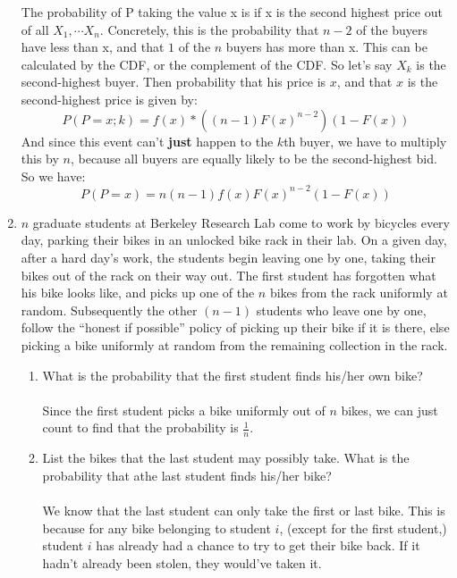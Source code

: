 \begin{enumerate}
    The probability of P taking the value x is if x is the second highest price out of all $X_1, \cdots X_n$. Concretely, this is the probability that $n-2$ of the buyers have less than x, and that $1$ of the $n$ buyers has more than x. This can be calculated by the CDF, or the complement of the CDF. So let's say $X_k$ is the second-highest buyer. Then probability that his price is $x$, and that $x$ is the second-highest price is given by:
    $$P(P = x; k) = f(x) * ((n-1)F(x)^{n-2})(1-F(x))$$
    And since this event can't \textbf{just} happen to the $k$th buyer, we have to multiply this by $n$, because all buyers are equally likely to be the second-highest bid. So we have:
    $$P(P = x) = n(n-1)f(x)F(x)^{n-2}(1-F(x))$$


  \item $n$ graduate students at Berkeley Research Lab come to work by bicycles every day, parking their bikes in an unlocked bike rack in their lab. On a given day, after a hard day's work, the students begin leaving one by one, taking their bikes out of the rack on their way out. The first student has forgotten what his bike looks like, and picks up one of the $n$ bikes from the rack uniformly at random. Subsequently the other $(n-1)$ students who leave one by one, follow the ``honest if possible'' policy of picking up their bike if it is there, else picking a bike uniformly at random from the remaining collection in the rack.

    \begin{enumerate}
      \item What is the probability that the first student finds his/her own bike?\\\\
        
        Since the first student picks a bike uniformly out of $n$ bikes, we can just count to find that the probability is $\frac{1}{n}$.

      \item List the bikes that the last student may possibly take. What is the probability that athe last student finds his/her bike?\\\\

        We know that the last student can only take the first or last bike. This is because for any bike belonging to student $i$, (except for the first student,)  student $i$ has already had a chance to try to get their bike back. If it hadn't already been stolen, they would've taken it.\\


\end{enumerate}
\end{enumerate}
